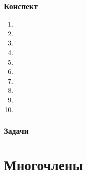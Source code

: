 \subsection*{Конспект}
\begin{enumerate}\setlength{\itemsep}{1pt}
\item 
\item 
\item 
\item 
\item 
\item 
\item 
\item 
\item 
\item 
\end{enumerate}
\subsection*{Задачи}


\chapter{Многочлены}


